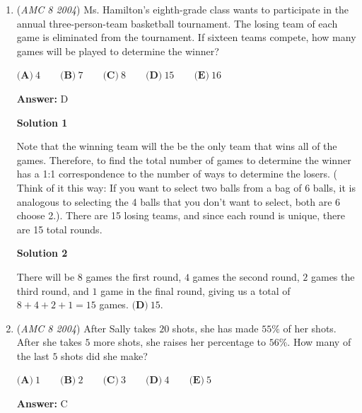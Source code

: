 \begin{enumerate}
 



\textbf{Solution 2}

We can choose $3$ people by eliminating one from a set of $4$ one at a time and the other three get selected. There are $4$ ways to remove a person from a group of four (without considering order), so there are $\boxed{\textbf{(B)}\ 4}$ ways to choose three people, where order doesn't matter.

 


	\item (\textit{AMC 8 2004}) Ms. Hamilton's eighth-grade class wants to participate in the annual three-person-team basketball tournament. The losing team of each game is eliminated from the tournament. If sixteen teams compete, how many games will be played to determine the winner?


 $\textbf{(A)}\ 4\qquad\textbf{(B)}\ 7\qquad\textbf{(C)}\ 8\qquad\textbf{(D)}\ 15\qquad\textbf{(E)}\ 16$

 \textbf{Answer: }D



\textbf{Solution 1}

Note that the winning team will the be the only team that wins all of the games. Therefore, to find the total number of games to determine the winner has a 1:1 correspondence to the number of ways to determine the losers. ( Think of it this way: If you want to select two balls from a bag of 6 balls, it is analogous to selecting the 4 balls that you don't want to select, both are 6 choose 2.). There are 15 losing teams, and since each round is unique, there are 15 total rounds. 

 



\textbf{Solution 2}

There will be $8$ games the first round, $4$ games the second round, $2$ games the third round, and $1$ game in the final round, giving us a total of $8+4+2+1=15$ games. $\boxed{\textbf{(D)}\ 15}$.

 


	\item (\textit{AMC 8 2004}) After Sally takes $20$ shots, she has made $55\%$ of her shots. After she takes $5$ more shots, she raises her percentage to $56\%$. How many of the last $5$ shots did she make?


 $\textbf{(A)}\ 1\qquad\textbf{(B)}\ 2\qquad\textbf{(C)}\ 3\qquad\textbf{(D)}\ 4\qquad\textbf{(E)}\ 5$

 \textbf{Answer: }C




\end{enumerate}
